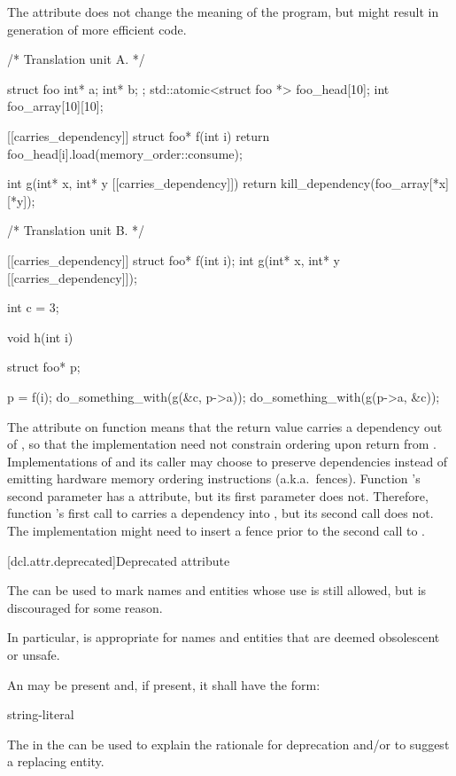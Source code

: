 \pnum
\begin{note}
The  attribute does not change the meaning of the
program, but might result in generation of more efficient code.
\end{note}

\pnum
\begin{example}
\begin{codeblock}
/* Translation unit A. */

struct foo { int* a; int* b; };
std::atomic<struct foo *> foo_head[10];
int foo_array[10][10];

[[carries_dependency]] struct foo* f(int i) {
  return foo_head[i].load(memory_order::consume);
}

int g(int* x, int* y [[carries_dependency]]) {
  return kill_dependency(foo_array[*x][*y]);
}

/* Translation unit B. */

[[carries_dependency]] struct foo* f(int i);
int g(int* x, int* y [[carries_dependency]]);

int c = 3;

void h(int i) {
  struct foo* p;

  p = f(i);
  do_something_with(g(&c, p->a));
  do_something_with(g(p->a, &c));
}
\end{codeblock}

The  attribute on function  means that the
return value carries a dependency out of , so that the implementation
need not constrain ordering upon return from . Implementations of
 and its caller may choose to preserve dependencies instead of emitting
hardware memory ordering instructions (a.k.a.\ fences).
Function 's second parameter has a  attribute,
but its first parameter does not. Therefore, function 's first call to
 carries a dependency into , but its second call does not. The
implementation might need to insert a fence prior to the second call to
.
\end{example}
%

[dcl.attr.deprecated]{Deprecated attribute}%

\pnum
The   can be used to mark names and entities
whose use is still allowed, but is discouraged for some reason.
\begin{note}
In particular,
 is appropriate for names and entities that are deemed obsolescent or
unsafe.
\end{note}
An
 may be present and, if present, it shall have the form:
\begin{ncbnf}
\terminal{(} string-literal \terminal{)}
\end{ncbnf}
\begin{note}
The  in the 
can be used to explain the rationale for deprecation and/or to suggest a replacing entity.
\end{note}

